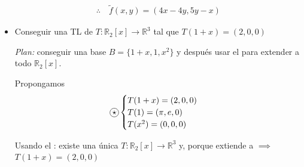 \begin{itemize}
\begin{gather*}
    \therefore \quad \tilde{f}(x,y) = \left(4x-4y, 5y - x\right)
\end{gather*}

\item Conseguir una TL de $T: \mathbb{R}_2[x] \to \mathbb{R}^3$ tal que
    $T(1+x) = (2,0,0)$

    \medskip

    \textit{Plan:} conseguir una base $B = \{ 1+x, 1, x^2 \}$
    y después usar el  para extender a todo 
    $\mathbb{R}_2[x]$.

    Propongamos
    \begin{gather*}
        \circled{$\star$}
        \begin{cases}
            T(1+x) = (2,0,0) \\
            T(1) = (\pi, e, 0) \\
            T(x^2) = (0,0,0)
        \end{cases}
    \end{gather*}

    Usando el : existe una única
    $T: \mathbb{R}_2[x] \to \mathbb{R}^3$
    y, porque extiende a \circled{$\star$} $\implies$
    $T(1+x) = (2,0,0)$
\end{itemize}
